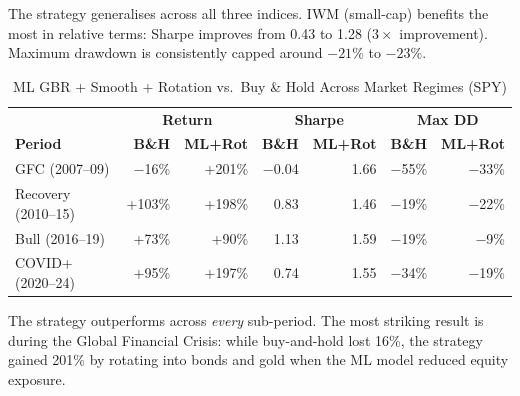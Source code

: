 \documentclass[11pt]{article}
\begin{document}
\noindent The strategy generalises across all three indices. IWM (small-cap) benefits the most in relative terms: Sharpe improves from 0.43 to 1.28 ($3\times$ improvement). Maximum drawdown is consistently capped around $-21\%$ to $-23\%$.

\begin{table}[ht]
\centering
\caption{ML GBR + Smooth + Rotation vs.\ Buy \& Hold Across Market Regimes (SPY)}
\small
\begin{tabular}{l|rr|rr|rr}
\toprule
 & \multicolumn{2}{c|}{\textbf{Return}} & \multicolumn{2}{c|}{\textbf{Sharpe}} & \multicolumn{2}{c}{\textbf{Max DD}} \\
\textbf{Period} & \cellcolor{benchbg}\textbf{B\&H} & \cellcolor{bestbg}\textbf{ML+Rot} & \cellcolor{benchbg}\textbf{B\&H} & \cellcolor{bestbg}\textbf{ML+Rot} & \cellcolor{benchbg}\textbf{B\&H} & \cellcolor{bestbg}\textbf{ML+Rot} \\
\midrule
GFC (2007--09) & $-$16\% & +201\% & $-$0.04 & 1.66 & $-$55\% & $-$33\% \\
Recovery (2010--15) & +103\% & +198\% & 0.83 & 1.46 & $-$19\% & $-$22\% \\
Bull (2016--19) & +73\% & +90\% & 1.13 & 1.59 & $-$19\% & $-$9\% \\
COVID+ (2020--24) & +95\% & +197\% & 0.74 & 1.55 & $-$34\% & $-$19\% \\
\bottomrule
\end{tabular}
\end{table}

\noindent The strategy outperforms across \emph{every} sub-period. The most striking result is during the Global Financial Crisis: while buy-and-hold lost 16\%, the strategy gained 201\% by rotating into bonds and gold when the ML model reduced equity exposure.
\end{document}
